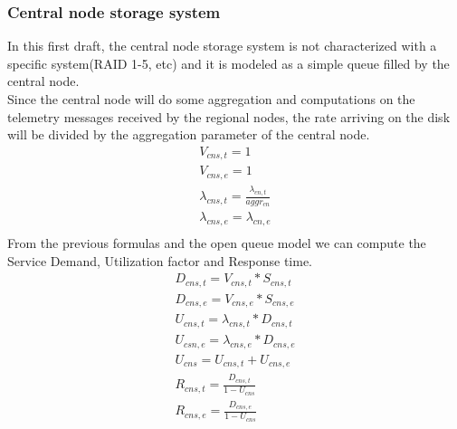 \documentclass[11pt]{article}
\begin{document}
\subsubsection{Central node storage system}
In this first draft, the central node storage system is not characterized with a specific system(RAID 1-5, etc) and it is modeled as a simple queue filled by the central node.\\
Since the central node will do some aggregation and computations on the telemetry messages received by the regional nodes, the rate arriving on the disk will be divided by the aggregation parameter of the central node.\\

\begin{equation}
	\begin{array}{l}
		V_{cns, t} = 1 \\
		V_{cns, e} = 1 \\
		\lambda_{cns, t} = \frac{\lambda_{cn,t}}{aggr_{cn}} \\
		\lambda_{cns, e} = \lambda_{cn,e} \\
	\end{array}
\end{equation}
From the previous formulas and the open queue model we can compute the Service Demand, Utilization factor and Response time.
\begin{equation}
	\begin{array}{l}
		D_{cns, t} = V_{cns, t} * S_{cns, t} \\
		D_{cns, e} = V_{cns, e} * S_{cns, e} \\
		U_{cns, t} = \lambda_{cns, t} * D_{cns, t} \\
		U_{csn, e} = \lambda_{cns, e} * D_{cns, e} \\
		U_{cns} = U_{cns, t} + U_{cns, e} \\
		R_{cns, t} = \frac{D_{cns, t}}{1 - U_{cns}} \\
		R_{cns, e} = \frac{D_{cns, e}}{1 - U_{cns}} \\
	\end{array}
\end{equation}
\end{document}
